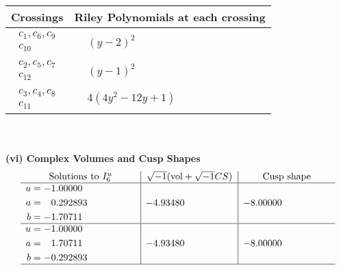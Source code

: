 \documentclass[1p]{elsarticle_modified}
\theoremstyle{definition}
\newcommand{\I}{\sqrt{-1}}
\begin{document}
\begin{tabular}{m{50pt}|m{274pt}}
Crossings & \hspace{64pt}Riley Polynomials at each crossing \\
\hline $$\begin{aligned}c_{1},c_{6},c_{9}\\c_{10}\end{aligned}$$&$\begin{aligned}
&(y-2)^2
\end{aligned}$\\
\hline $$\begin{aligned}c_{2},c_{5},c_{7}\\c_{12}\end{aligned}$$&$\begin{aligned}
&(y-1)^2
\end{aligned}$\\
\hline $$\begin{aligned}c_{3},c_{4},c_{8}\\c_{11}\end{aligned}$$&$\begin{aligned}
&4(4 y^2-12 y+1)
\end{aligned}$\\
\hline
\end{tabular}\\~\\
\newpage\flushleft \textbf{(vi) Complex Volumes and Cusp Shapes}
$$\begin{array}{c|c|c}  
\text{Solutions to }I^u_{6}& \I (\text{vol} + \sqrt{-1}CS) & \text{Cusp shape}\\
 \hline 
\begin{aligned}
u &= -1.00000\phantom{ +0.000000I} \\
a &= \phantom{-}0.292893\phantom{ +0.000000I} \\
b &= -1.70711\phantom{ +0.000000I}\end{aligned}
 & -4.93480\phantom{ +0.000000I} & -8.00000\phantom{ +0.000000I} \\ \hline\begin{aligned}
u &= -1.00000\phantom{ +0.000000I} \\
a &= \phantom{-}1.70711\phantom{ +0.000000I} \\
b &= -0.292893\phantom{ +0.000000I}\end{aligned}
 & -4.93480\phantom{ +0.000000I} & -8.00000\phantom{ +0.000000I}\\
 \hline 
 \end{array}$$\newpage\newpage\renewcommand{\arraystretch}{1}
\end{document}
